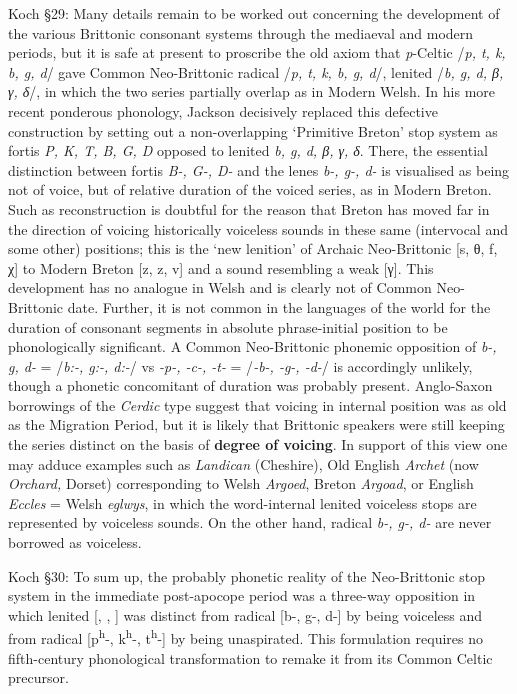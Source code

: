  Koch \S29: Many details remain to be worked out concerning the development of the various Brittonic consonant systems through the mediaeval and modern periods, but it is safe at present to proscribe the old axiom that \textit{p}-Celtic /\textit{p, t, k, b, g, d}/ gave Common Neo-Brittonic radical /\textit{p, t, k, b, g, d}/, lenited /\textit{b, g, d,  β, γ,  δ}/, in which the two series partially overlap as in Modern Welsh. In his more recent ponderous phonology, Jackson decisively replaced this defective construction by setting out a non-overlapping `Primitive Breton' stop system as fortis \textit{P, K, T, B, G, D} opposed to lenited \textit{b, g, d,  β, γ,  δ}. There, the essential distinction between fortis \textit{B-, G-, D-} and the lenes \textit{b-, g-, d-} is visualised as being not of voice, but of relative duration of the voiced series, as in Modern Breton. Such as reconstruction is doubtful for the reason that Breton has moved far in the direction of voicing historically voiceless sounds in these same (intervocal and some other) positions; this is the `new lenition' of Archaic Neo-Brittonic [s, θ, f, χ] to Modern Breton [z, z, v] and a sound resembling a weak [γ]. This development has no analogue in Welsh and is clearly not of Common Neo-Brittonic date. Further, it is not common in the languages of the world for the duration of consonant segments in absolute phrase-initial position to be phonologically significant. A Common Neo-Brittonic phonemic opposition of \textit{b-, g, d-} = /\textit{b:-, g:-, d:-}/ vs \textit{-p-, -c-, -t-} = /\textit{-b-, -g-, -d-}/ is accordingly unlikely, though a phonetic concomitant of duration was probably present. Anglo-Saxon borrowings of the \textit{Cerdic} type suggest that voicing in internal position was as old as the Migration Period, but it is likely that Brittonic speakers were still keeping the series distinct on the basis of \textbf{degree of voicing}. In support of this view one may adduce examples such as \textit{Landican} (Cheshire), Old English \textit{Archet} (now \textit{Orchard,} Dorset) corresponding to Welsh \textit{Argoed}, Breton \textit{Argoad}, or English \textit{Eccles} = Welsh \textit{eglwys}, in which the word-internal lenited voiceless stops are represented by voiceless sounds. On the other hand, radical \textit{b-, g-, d-} are never borrowed as voiceless.
 
 Koch \S30: To sum up, the probably phonetic reality of the Neo-Brittonic stop system in the immediate post-apocope period was a three-way opposition in which lenited [\bd, \gd, \dd] was distinct from radical [b-, g-, d-] by being voiceless and from radical [p\textsuperscript{h}-, k\textsuperscript{h}-, t\textsuperscript{h}-] by being unaspirated. This formulation requires no fifth-century phonological transformation to remake it from its Common Celtic precursor.
 
